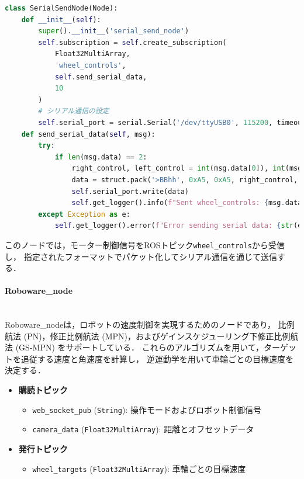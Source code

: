 \begin{lstlisting}[language=Python, caption=制御信号の送信 (serial\_send\_node.py)]
class SerialSendNode(Node):
    def __init__(self):
        super().__init__('serial_send_node')
        self.subscription = self.create_subscription(
            Float32MultiArray,
            'wheel_controls',
            self.send_serial_data,
            10
        )
        # シリアル通信の設定
        self.serial_port = serial.Serial('/dev/ttyUSB0', 115200, timeout=1)
    def send_serial_data(self, msg):
        try:
            if len(msg.data) == 2:
                right_control, left_control = int(msg.data[0]), int(msg.data[1])
                data = struct.pack('>BBhh', 0xA5, 0xA5, right_control, left_control)
                self.serial_port.write(data)
                self.get_logger().info(f"Sent wheel_controls: {msg.data}")
        except Exception as e:
            self.get_logger().error(f"Error sending serial data: {str(e)}")
\end{lstlisting}

このノードでは，モーター制御信号をROSトピック\texttt{wheel\_controls}から受信し，
指定されたフォーマットでパケット化してシリアル通信を通じて送信する．


\paragraph{Roboware\_node}\mbox{}\\
Roboware\_nodeは，ロボットの速度制御を実現するためのノードであり，
比例航法 (PN)，修正比例航法 (MPN)，およびゲインスケジューリング下修正比例航法 (GS-MPN)
をサポートしている．
これらのアルゴリズムを用いて，ターゲットを追従する速度と角速度を計算し，
逆運動学を用いて車輪ごとの目標速度を決定する．

\begin{itemize}
    \item \textbf{購読トピック}
          \begin{itemize}
              \item \texttt{web\_socket\_pub} (\texttt{String}): 操作モードおよびロボット制御信号
              \item \texttt{camera\_data} (\texttt{Float32MultiArray}): 距離とオフセットデータ
          \end{itemize}
    \item \textbf{発行トピック}
          \begin{itemize}
              \item \texttt{wheel\_targets} (\texttt{Float32MultiArray}): 車輪ごとの目標速度
          \end{itemize}
\end{itemize}

